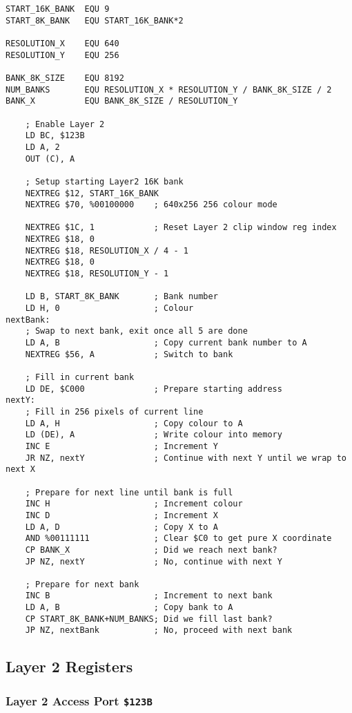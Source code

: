 \documentclass[12pt,twoside,openright,a4paper]{book}
\begin{document}
\begin{Verbatim}
START_16K_BANK  EQU 9
START_8K_BANK   EQU START_16K_BANK*2

RESOLUTION_X    EQU 640
RESOLUTION_Y    EQU 256

BANK_8K_SIZE    EQU 8192
NUM_BANKS       EQU RESOLUTION_X * RESOLUTION_Y / BANK_8K_SIZE / 2
BANK_X          EQU BANK_8K_SIZE / RESOLUTION_Y

	; Enable Layer 2
	LD BC, $123B
	LD A, 2
	OUT (C), A

	; Setup starting Layer2 16K bank
	NEXTREG $12, START_16K_BANK
	NEXTREG $70, %00100000    ; 640x256 256 colour mode

	NEXTREG $1C, 1            ; Reset Layer 2 clip window reg index
	NEXTREG $18, 0
	NEXTREG $18, RESOLUTION_X / 4 - 1
	NEXTREG $18, 0
	NEXTREG $18, RESOLUTION_Y - 1

	LD B, START_8K_BANK       ; Bank number
	LD H, 0                   ; Colour
nextBank:
	; Swap to next bank, exit once all 5 are done
	LD A, B                   ; Copy current bank number to A
	NEXTREG $56, A            ; Switch to bank

	; Fill in current bank
	LD DE, $C000              ; Prepare starting address
nextY:
	; Fill in 256 pixels of current line
	LD A, H                   ; Copy colour to A
	LD (DE), A                ; Write colour into memory
	INC E                     ; Increment Y
	JR NZ, nextY              ; Continue with next Y until we wrap to next X

	; Prepare for next line until bank is full
	INC H                     ; Increment colour
	INC D                     ; Increment X
	LD A, D                   ; Copy X to A
	AND %00111111             ; Clear $C0 to get pure X coordinate
	CP BANK_X                 ; Did we reach next bank?
	JP NZ, nextY              ; No, continue with next Y

	; Prepare for next bank
	INC B                     ; Increment to next bank
	LD A, B                   ; Copy bank to A
	CP START_8K_BANK+NUM_BANKS; Did we fill last bank?
	JP NZ, nextBank           ; No, proceed with next bank
\end{Verbatim}


\subsection{Layer 2 Registers}
\label{zx_next_layer2_registers}

\subsubsection{Layer 2 Access Port {\tt \$123B}}
\end{document}
